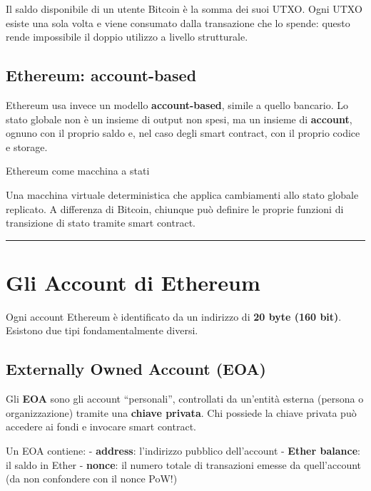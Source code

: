 \documentclass[
  italian,
  openany]{book}
\begin{document}
Il saldo disponibile di un utente Bitcoin è la somma dei suoi UTXO. Ogni
UTXO esiste una sola volta e viene consumato dalla transazione che lo
spende: questo rende impossibile il doppio utilizzo a livello
strutturale.

\subsection{Ethereum: account-based}\label{ethereum-account-based}

Ethereum usa invece un modello \textbf{account-based}, simile a quello
bancario. Lo stato globale non è un insieme di output non spesi, ma un
insieme di \textbf{account}, ognuno con il proprio saldo e, nel caso
degli smart contract, con il proprio codice e storage.

\begin{calloutdefinition}{Ethereum come macchina a stati}

Una macchina virtuale deterministica che applica cambiamenti allo stato
globale replicato. A differenza di Bitcoin, chiunque può definire le
proprie funzioni di transizione di stato tramite smart contract.

\end{calloutdefinition}

\begin{center}\rule{0.5\linewidth}{0.5pt}\end{center}

\section{Gli Account di Ethereum}\label{gli-account-di-ethereum}

Ogni account Ethereum è identificato da un indirizzo di \textbf{20 byte
(160 bit)}. Esistono due tipi fondamentalmente diversi.

\subsection{Externally Owned Account
(EOA)}\label{externally-owned-account-eoa}

Gli \textbf{EOA} sono gli account ``personali'', controllati da
un'entità esterna (persona o organizzazione) tramite una \textbf{chiave
privata}. Chi possiede la chiave privata può accedere ai fondi e
invocare smart contract.

Un EOA contiene: - \textbf{address}: l'indirizzo pubblico dell'account -
\textbf{Ether balance}: il saldo in Ether - \textbf{nonce}: il numero
totale di transazioni emesse da quell'account (da non confondere con il
nonce PoW!)
\end{document}
